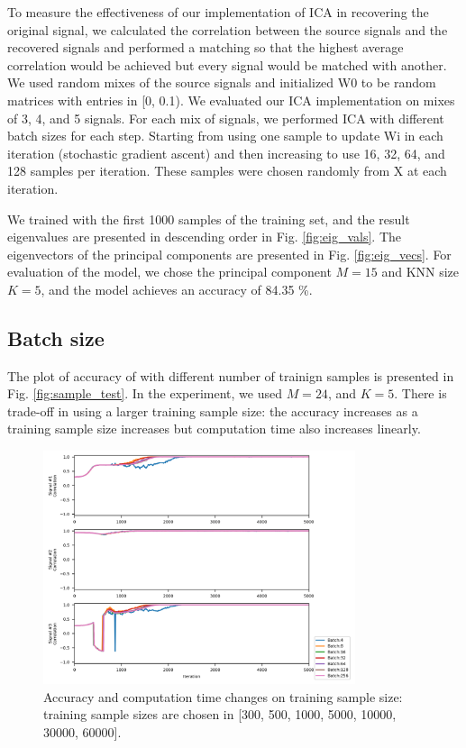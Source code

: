 \documentclass[conference]{IEEEtran}
\begin{document}
To measure the effectiveness of our implementation of ICA in recovering the original signal, we calculated the correlation between the source signals and the recovered signals and performed a matching so that the highest average correlation would be achieved but every signal would be matched with another. We used random mixes of the source signals and initialized W0 to be random matrices with entries in [0, 0.1).
We evaluated our ICA implementation on mixes of 3, 4, and 5 signals. For each mix of signals, we performed ICA with different batch sizes for each step. Starting from using one sample to update Wi in each iteration (stochastic gradient ascent) and then increasing to use 16, 32, 64, and 128 samples per iteration. These samples were chosen randomly from X at each iteration.

We trained with the first 1000 samples of the training set, and the result eigenvalues are presented in descending order in Fig. \ref{fig:eig_vals}.
The eigenvectors of the principal components are presented in Fig. \ref{fig:eig_vecs}.
For evaluation of the model, we chose the principal component $M=15$ and KNN size $K=5$, and the model achieves an accuracy of 84.35 \%.


\subsection{Batch size}

The plot of accuracy of with different number of trainign samples is presented in Fig. \ref{fig:sample_test}.
In the experiment, we used $M=24$, and $K=5$.
There is trade-off in using a larger training sample size: the accuracy increases as a training sample size increases but computation time also increases linearly.

\begin{figure}[!t]
	\centering
	\includegraphics[width=3.6in]{batch_test.png}	
	\caption{Accuracy and computation time changes on training sample size: training sample sizes are chosen in [300, 500, 1000, 5000, 10000, 30000, 60000].}
	\label{fig:batch_test}
\end{figure}
\end{document}
